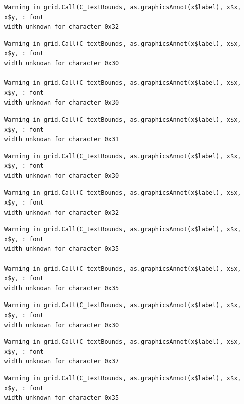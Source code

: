 \documentclass[
  letterpaper,
  DIV=11,
  numbers=noendperiod]{scrreprt}
\begin{document}
\begin{verbatim}
Warning in grid.Call(C_textBounds, as.graphicsAnnot(x$label), x$x, x$y, : font
width unknown for character 0x32
\end{verbatim}

\begin{verbatim}
Warning in grid.Call(C_textBounds, as.graphicsAnnot(x$label), x$x, x$y, : font
width unknown for character 0x30

Warning in grid.Call(C_textBounds, as.graphicsAnnot(x$label), x$x, x$y, : font
width unknown for character 0x30
\end{verbatim}

\begin{verbatim}
Warning in grid.Call(C_textBounds, as.graphicsAnnot(x$label), x$x, x$y, : font
width unknown for character 0x31
\end{verbatim}

\begin{verbatim}
Warning in grid.Call(C_textBounds, as.graphicsAnnot(x$label), x$x, x$y, : font
width unknown for character 0x30
\end{verbatim}

\begin{verbatim}
Warning in grid.Call(C_textBounds, as.graphicsAnnot(x$label), x$x, x$y, : font
width unknown for character 0x32
\end{verbatim}

\begin{verbatim}
Warning in grid.Call(C_textBounds, as.graphicsAnnot(x$label), x$x, x$y, : font
width unknown for character 0x35

Warning in grid.Call(C_textBounds, as.graphicsAnnot(x$label), x$x, x$y, : font
width unknown for character 0x35
\end{verbatim}

\begin{verbatim}
Warning in grid.Call(C_textBounds, as.graphicsAnnot(x$label), x$x, x$y, : font
width unknown for character 0x30
\end{verbatim}

\begin{verbatim}
Warning in grid.Call(C_textBounds, as.graphicsAnnot(x$label), x$x, x$y, : font
width unknown for character 0x37
\end{verbatim}

\begin{verbatim}
Warning in grid.Call(C_textBounds, as.graphicsAnnot(x$label), x$x, x$y, : font
width unknown for character 0x35
\end{verbatim}
\end{document}
